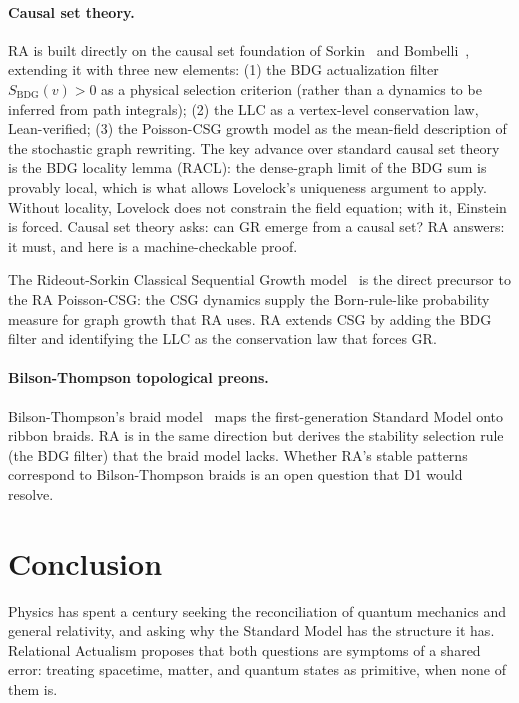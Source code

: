 \documentclass[11pt,a4paper]{article}
\newcommand{\SBDG}{S_{\mathrm{BDG}}}
\begin{document}
\paragraph{Causal set theory.} RA is built directly on the causal set
foundation of Sorkin~\citep{Sorkin1994} and Bombelli~\citep{Bombelli1987},
extending it with three new elements: (1) the BDG actualization filter
$\SBDG(v) > 0$ as a physical selection criterion (rather than a dynamics
to be inferred from path integrals); (2) the LLC as a vertex-level
conservation law, Lean-verified; (3) the Poisson-CSG growth model as
the mean-field description of the stochastic graph rewriting.
The key advance over standard causal set theory is the BDG locality lemma
(RACL): the dense-graph limit of the BDG sum is provably local, which
is what allows Lovelock's uniqueness argument to apply. Without locality,
Lovelock does not constrain the field equation; with it, Einstein is forced.
Causal set theory asks: can GR emerge from a causal set? RA answers: it
must, and here is a machine-checkable proof.

The Rideout-Sorkin Classical Sequential Growth model~\citep{Rideout2000}
is the direct precursor to the RA Poisson-CSG: the CSG dynamics supply
the Born-rule-like probability measure for graph growth that RA uses.
RA extends CSG by adding the BDG filter and identifying the LLC
as the conservation law that forces GR.

\paragraph{Bilson-Thompson topological preons.}
Bilson-Thompson's braid model~\citep{BilsonThompson2005} maps the
first-generation Standard Model onto ribbon braids. RA is in the same
direction but derives the stability selection rule (the BDG filter)
that the braid model lacks. Whether RA's stable patterns correspond to
Bilson-Thompson braids is an open question that D1 would resolve.

\section{Conclusion}
\label{sec:conclusion}

Physics has spent a century seeking the reconciliation of quantum
mechanics and general relativity, and asking why the Standard Model
has the structure it has. Relational Actualism proposes that both
questions are symptoms of a shared error: treating spacetime,
matter, and quantum states as primitive, when none of them is.
\end{document}
